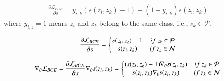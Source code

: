 \documentclass[review]{elsarticle}
\begin{document}
\begin{appendix}
\begin{equation}
\begin{aligned}
\frac{\partial \mathcal{L} _{BCE}}{\partial s} = y_{i,k}(s(z_i,z_k)-1)+(1-y_{i,k})s(z_i,z_k)
\end{aligned}
\end{equation}
where $y_{i,k}=1$ means $z_i$ and $z_k$ belong to the same class, i.e., $ z_k\in  \mathcal{P}  $.

\begin{equation}
\begin{aligned}
\frac{\partial \mathcal{L} _{BCE}}{\partial s} = \left\{\begin{matrix}
 s(z_i,z_k)-1  & if  \thinspace  z_k\in  \mathcal{P} \\ 
 s(z_i,z_k)  & if  \thinspace z_k\in  \mathcal{N}
\end{matrix}\right.
\end{aligned}
\end{equation}


\begin{equation}
\begin{aligned}
\nabla_{\theta}\mathcal{L} _{BCE}= \frac{\partial \mathcal{L} _{BCE}}{\partial s}\nabla_{\theta}s(z_i,z_k) =
\left\{\begin{matrix}
( s( z_i,z_k)-1)\nabla_{\theta}s( z_i,z_k)  & if $\thinspace$  z_k\in  \mathcal{P} 
 \\ 
s( z_i,z_k)\nabla_{\theta}s( z_i,z_k)  &if $\thinspace$   z_k\in  \mathcal{N}  
\end{matrix}\right.
\end{aligned}
\end{equation}


\end{appendix}
 
\end{document}
